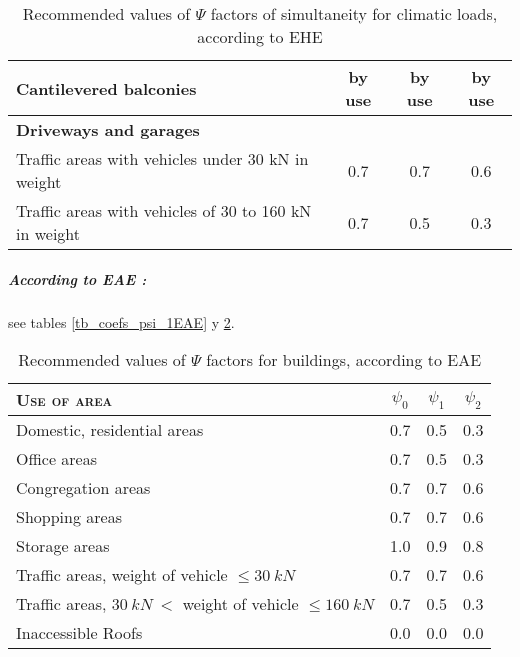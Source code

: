 \begin{table}
\begin{center}
\begin{small}
\begin{tabular}{|l|c|c|c|}
Cantilevered balconies & by use & by use & by use \\
\hline
\textbf{Driveways and garages} & & & \\
\hline
Traffic areas with vehicles under 30 kN in weight & 0.7 & 0.7 & 0.6 \\
Traffic areas with vehicles of 30 to 160 kN in weight & 0.7 & 0.5 & 0.3 \\
\hline
\end{tabular}
\end{small}
\end{center}
\caption{Recommended values of $\Psi$ factors of simultaneity for climatic loads, according to EHE} \label{tb_coefs_psi_2EHE}
\end{table}

\subparagraph{According to EAE \cite{EAE} :} see tables \ref{tb_coefs_psi_1EAE} y \ref{tb_coefs_psi_2EAE}.

\begin{table}
\begin{center}
\begin{small}
\begin{tabular}{|l|c|c|c|}
\hline
\textsc{Use of area} & $\psi_{0}$ & $\psi_{1}$ & $\psi_{2}$ \\
\hline
Domestic, residential areas & 0.7 & 0.5 & 0.3 \\
Office areas & 0.7 & 0.5 & 0.3 \\
Congregation areas  & 0.7 & 0.7 & 0.6 \\
Shopping areas & 0.7 & 0.7 & 0.6 \\
Storage areas & 1.0 & 0.9 & 0.8 \\
Traffic areas, weight of vehicle $\leq 30\ kN$ & 0.7 & 0.7 & 0.6 \\
Traffic areas, $30\ kN\ <$ weight of vehicle $\leq 160\ kN$ & 0.7 & 0.5 & 0.3 \\
Inaccessible Roofs  & 0.0 & 0.0 & 0.0 \\
\hline
\end{tabular}
\end{small}
\end{center}
\caption{Recommended values of $\Psi$ factors for buildings, according to EAE} \label{tb_coefs_psi_2EAE}
\end{table}

